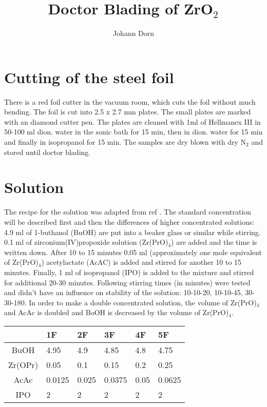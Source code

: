 \documentclass[a4paper]{article}
\title{Doctor Blading of ZrO$_2$}
\author{Johann Dorn}
\begin{document}
\maketitle
\iffalse
my notes
\fi
\justify


\section{Cutting of the steel foil}
There is a red foil cutter in the vacuum room, which cuts the foil without much bending.
The foil is cut into 2.5 x 2.7 mm plates.
The small plates are marked with an diamond cutter pen.
The plates are cleaned with 1ml of Hellmanex III in 50-100 ml dion. water in the sonic bath for 15 min, then in dion. water for 15 min and finally in isopropanol for 15 min. 
The samples are dry blown with dry N$_2$ and stored until doctor blading.

\section{Solution}
The recipe for the solution was adapted from ref \cite{Hu2016}.
The standard concentration will be described first and then the differences of higher concentrated solutions:
4.9 ml of 1-buthanol (BuOH) are put into a beaker glass or similar while stirring. 
0.1 ml of zirconium(IV)propoxide solution (Zr(PrO)$_4$) are added and the time is written down. 
After 10 to 15 minutes 0.05 ml (approximately one mole equivalent of Zr(PrO)$_4$) acetylactate (AcAC) is added and stirred for another 10 to 15 minutes. 
Finally, 1 ml of isopropanol (IPO) is added to the mixture and stirred for additional 20-30 minutes. 
Following stirring times (in minutes) were tested and didn't have an influence on stability of the solution: 10-10-20, 10-10-45, 30-30-180. 
In order to make a double concentrated solution, the volume of Zr(PrO)$_4$ and AcAc is doubled and BoOH is decreased by the volume of Zr(PrO)$_4$. 

\begin{table}[h]
	\centering
	\begin{tabular}{clllll}
		\hline
				&1F		&2F		&3F		&4F		&5F	\\
		\hline
		BuOH	&4.95	&4.9	&4.85	&4.8	&4.75	\\
		Zr(OPr)	&0.05	&0.1	&0.15	&0.2	&0.25	\\
		AcAc	&0.0125	&0.025	&0.0375	&0.05	&0.0625	\\
		IPO		&2		&2		&2		&2		&2		\\
		\hline
	\end{tabular}
\end{table}
\end{document}
